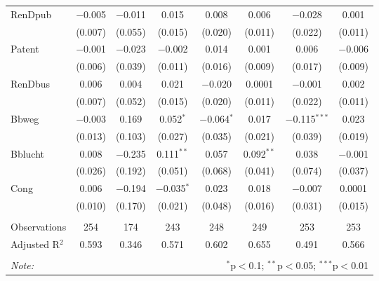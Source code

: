 \begin{table}
\begin{tabular}{@{\extracolsep{5pt}}lccccccc}
  RenDpub & $-$0.005 & $-$0.011 & 0.015 & 0.008 & 0.006 & $-$0.028 & 0.001 \\ 
  & (0.007) & (0.055) & (0.015) & (0.020) & (0.011) & (0.022) & (0.011) \\ 
  Patent & $-$0.001 & $-$0.023 & $-$0.002 & 0.014 & 0.001 & 0.006 & $-$0.006 \\ 
  & (0.006) & (0.039) & (0.011) & (0.016) & (0.009) & (0.017) & (0.009) \\ 
  RenDbus & 0.006 & 0.004 & 0.021 & $-$0.020 & 0.0001 & $-$0.001 & 0.002 \\ 
  & (0.007) & (0.052) & (0.015) & (0.020) & (0.011) & (0.022) & (0.011) \\ 
  Bbweg & $-$0.003 & 0.169 & 0.052$^{*}$ & $-$0.064$^{*}$ & 0.017 & $-$0.115$^{***}$ & 0.023 \\ 
  & (0.013) & (0.103) & (0.027) & (0.035) & (0.021) & (0.039) & (0.019) \\ 
  Bblucht & 0.008 & $-$0.235 & 0.111$^{**}$ & 0.057 & 0.092$^{**}$ & 0.038 & $-$0.001 \\ 
  & (0.026) & (0.192) & (0.051) & (0.068) & (0.041) & (0.074) & (0.037) \\ 
  Cong & 0.006 & $-$0.194 & $-$0.035$^{*}$ & 0.023 & 0.018 & $-$0.007 & 0.0001 \\ 
  & (0.010) & (0.170) & (0.021) & (0.048) & (0.016) & (0.031) & (0.015) \\ 
 \hline \\[-1.8ex] 
Observations & 254 & 174 & 243 & 248 & 249 & 253 & 253 \\ 
Adjusted R$^{2}$ & 0.593 & 0.346 & 0.571 & 0.602 & 0.655 & 0.491 & 0.566 \\ 
\hline 
\hline \\[-1.8ex] 
\textit{Note:}  & \multicolumn{7}{r}{$^{*}$p$<$0.1; $^{**}$p$<$0.05; $^{***}$p$<$0.01} \\ 
\end{tabular}
\end{table} 
